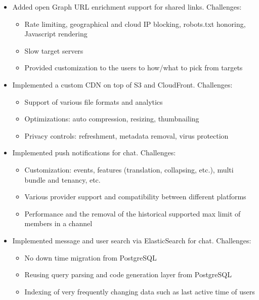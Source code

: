 \documentclass[line, margin]{res}
\begin{document}
\begin{resume}
\begin{itemize}
	\item{Added open Graph URL enrichment support for shared links. Challenges:}
		\begin{itemize} \itemsep -5pt \small
		\vspace{-.2cm}
		\item Rate limiting, geographical and cloud IP blocking, robots.txt honoring, Javascript rendering
		\item Slow target servers
		\item Provided customization to the users to how/what to pick from targets
		\end{itemize}
		
	\item{Implemented a custom CDN on top of S3 and CloudFront. Challenges:}
		\begin{itemize} \itemsep -5pt \small
		\vspace{-.2cm}
		\item Support of various file formats and analytics
		\item Optimizations: auto compression, resizing, thumbnailing
		\item Privacy controls: refreshment, metadata removal, virus protection
		\end{itemize}
	
	\item{Implemented push notifications for chat. Challenges:}
		\begin{itemize} \itemsep -5pt \small
		\vspace{-.2cm}
		\item Customization: events, features (translation, collapsing, etc.), multi bundle and tenancy, etc.
		\item Various provider support and compatibility between different platforms
		\item Performance and the removal of the historical supported max limit of members in a channel
		\end{itemize}
		
	\item{Implemented message and user search via ElasticSearch for chat. Challenges:}
		\begin{itemize} \itemsep -5pt \small
		\vspace{-.2cm}
		\item No down time migration from PostgreSQL
		\item Reusing query parsing and code generation layer from PostgreSQL
		\item Indexing of very frequently changing data such as last active time of users
		\end{itemize}
	

\end{itemize}
\end{resume}
\end{document}
